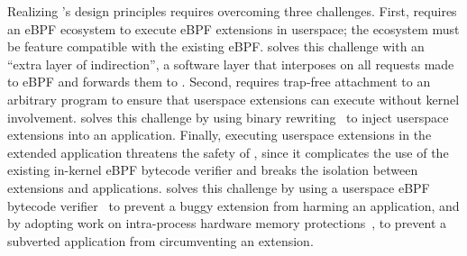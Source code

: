 

Realizing \sys{}'s design principles requires overcoming three challenges.  First, \sys{} requires an eBPF ecosystem to execute eBPF extensions in userspace; the ecosystem must be feature compatible with the existing eBPF.  \sys{} solves this challenge with an ``extra layer of indirection'', a software layer that interposes on all requests made to eBPF and forwards them to \sys{}.  Second, \sys{} requires trap-free attachment to an arbitrary program to ensure that userspace extensions can execute without kernel involvement.  \sys{} solves this challenge by using binary rewriting~\cite{Dinesh20, Chamith17, WilliamsKing20, fridagum} to inject userspace extensions into an application.  Finally, executing userspace extensions in the extended application threatens the safety of \sys{}, since it complicates the use of the existing in-kernel eBPF bytecode verifier and breaks the isolation between extensions and applications.  \sys{} solves this challenge by using a userspace eBPF bytecode verifier~\cite{Gershuni19} to prevent a buggy extension from harming an application, and by adopting work on intra-process hardware memory protections~\cite{Vahldiek19, xie2022cetis}, to prevent a subverted application from circumventing an extension. 


